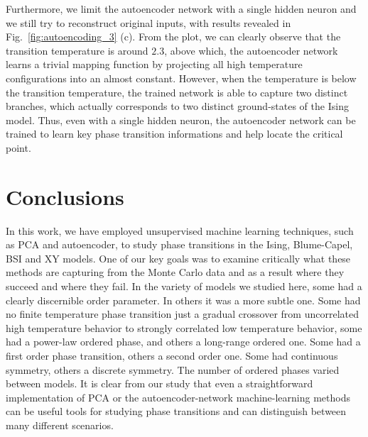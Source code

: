 \documentclass[pra,letterpaper,10pt,twocolumn]{revtex4}
\begin{document}
Furthermore, we limit the autoencoder network with a single hidden
neuron and we still try to reconstruct original inputs, with results
revealed in Fig.~\ref{fig:autoencoding_3} (c). From the plot, we can
clearly observe that the transition temperature is around $2.3$, above
which, the autoencoder network learns a trivial mapping function by
projecting all high temperature configurations into an almost constant.
However, when the temperature is below the transition temperature, the
trained network is able to capture two distinct branches, which actually
corresponds to two distinct ground-states of the Ising model.  Thus,
even with a single hidden neuron, the autoencoder network can be trained
to learn key phase transition informations and help locate the
critical point.


\section{Conclusions}


In this work, we have employed unsupervised machine learning techniques,
such as PCA and autoencoder, to study phase transitions in the Ising,
Blume-Capel, BSI and XY models. One of our key goals was to examine
critically what these methods are capturing from the Monte Carlo data
and as a result where they succeed and where they fail. In the variety
of models we studied here, some had a clearly discernible order
parameter.  In others it was a more subtle one. Some had no finite
temperature phase transition just a gradual crossover from uncorrelated
high temperature behavior to strongly correlated low temperature
behavior, some had a power-law ordered phase, and others a long-range
ordered one. Some had a first order phase transition, others a second
order one. Some had continuous symmetry, others a discrete symmetry. The
number of ordered phases varied between models.  It is clear from our
study that even a straightforward implementation of PCA or the
autoencoder-network machine-learning methods can be useful tools for
studying phase transitions and can distinguish between many different
scenarios.


\end{document}
